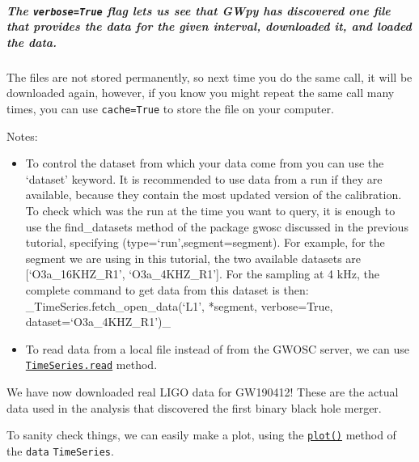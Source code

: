 \documentclass[11pt]{article}
\begin{document}
    \hypertarget{the-verbosetrue-flag-lets-us-see-that-gwpy-has-discovered-one-file-that-provides-the-data-for-the-given-interval-downloaded-it-and-loaded-the-data.}{%
\subparagraph{\texorpdfstring{The \texttt{verbose=True} flag lets us see
that GWpy has discovered one file that provides the data for the given
interval, downloaded it, and loaded the
data.}{The verbose=True flag lets us see that GWpy has discovered one file that provides the data for the given interval, downloaded it, and loaded the data.}}\label{the-verbosetrue-flag-lets-us-see-that-gwpy-has-discovered-one-file-that-provides-the-data-for-the-given-interval-downloaded-it-and-loaded-the-data.}}

The files are not stored permanently, so next time you do the same call,
it will be downloaded again, however, if you know you might repeat the
same call many times, you can use \texttt{cache=True} to store the file
on your computer.

Notes:

\begin{itemize}
\item
  To control the dataset from which your data come from you can use the
  `dataset' keyword. It is recommended to use data from a run if they
  are available, because they contain the most updated version of the
  calibration. To check which was the run at the time you want to query,
  it is enough to use the find\_datasets method of the package gwosc
  discussed in the previous tutorial, specifying
  (type=`run',segment=segment). For example, for the segment we are
  using in this tutorial, the two available datasets are
  {[}`O3a\_16KHZ\_R1', `O3a\_4KHZ\_R1'{]}. For the sampling at 4 kHz,
  the complete command to get data from this dataset is then:
  \_TimeSeries.fetch\_open\_data(`L1', *segment, verbose=True,
  dataset=`O3a\_4KHZ\_R1')\_
\item
  To read data from a local file instead of from the GWOSC server, we
  can use
  \href{https://gwpy.github.io/docs/stable/api/gwpy.timeseries.TimeSeries.html\#gwpy.timeseries.TimeSeries.read}{\texttt{TimeSeries.read}}
  method.
\end{itemize}

We have now downloaded real LIGO data for GW190412! These are the actual
data used in the analysis that discovered the first binary black hole
merger.

    To sanity check things, we can easily make a plot, using the
\href{https://gwpy.github.io/docs/stable/timeseries/plot.html}{\texttt{plot()}}
method of the \texttt{data} \texttt{TimeSeries}.
\end{document}
